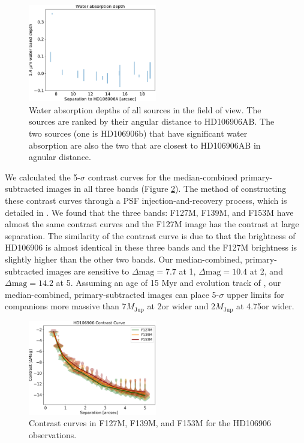 \documentclass[twocolumn]{aastex62}
\newcommand{\mjup}{\ensuremath{M_\mathrm{Jup}}\xspace}
\begin{document}
\begin{figure}
  \centering
  \includegraphics[width=0.5\textwidth]{figures/bck_waterdepth.pdf}
  \caption{Water absorption depths of all sources in the field of view. The sources are ranked by their angular distance to HD106906AB. The two sources (one is HD106906b) that have significant water absorption are also the two that are closest to HD106906AB in agnular distance.}
  \label{fig:backgroundsources}
\end{figure}

We calculated the 5-$\sigma$ contrast curves for the median-combined primary-subtracted images in all three bands (Figure \ref{fig:contrast_curve}). The method of constructing these contrast curves through a PSF injection-and-recovery process, which is detailed in  \citet{Zhou2019}.  We found that the three bands: F127M, F139M, and F153M have almost the same contrast curves and the F127M image has the contrast at large separation. The similarity of the contrast curve is due to that the brightness of HD106906 is almost identical in these three bands and the F127M brightness is slightly higher than the other two bands. Our median-combined, primary-subtracted images are sensitive to $\Delta \mbox{mag}=7.7$ at 1\arcsec, $\Delta \mbox{mag}=10.4$ at 2\arcsec, and $\Delta \mbox{mag}=14.2$ at 5\arcsec. Assuming an age of 15 Myr and evolution track of \citet{Saumon2008}, our median-combined, primary-subtracted images can place 5-$\sigma$ upper limits for companions more massive than 7\mjup at 2\arcsec or wider and 2\mjup at 4.75\arcsec or wider.

\begin{figure}
  \centering
  \includegraphics[width=0.5\textwidth]{figures/contrast_curve.pdf}
  \caption{Contrast curves in F127M, F139M, and F153M for the HD106906 observations.}
  \label{fig:contrast_curve}
\end{figure}
\end{document}
